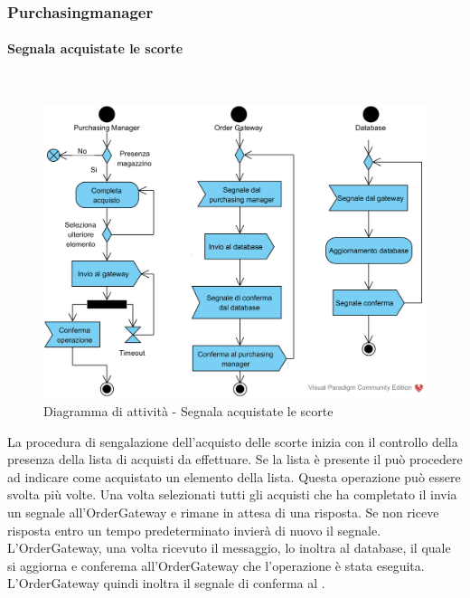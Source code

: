 \subsubsection{Purchasingmanager}


\paragraph{Segnala acquistate le scorte}\mbox{}\\
\nopagebreak
\begin{figure}[H]
	\centering
	\includegraphics[width=14cm]{diagrammi_img/attivita/responsabile_acquisto.png}
	\caption{Diagramma di attività - Segnala acquistate le scorte}
\end{figure}
La procedura di sengalazione dell'acquisto delle scorte inizia con il controllo della presenza della lista di acquisti da effettuare. Se la lista è presente il \Purchasingmanager{} può procedere ad indicare come acquistato un elemento della lista. Questa operazione può essere svolta più volte. Una volta selezionati tutti gli acquisti che ha completato il \Purchasingmanager{} invia un segnale all'OrderGateway e rimane in attesa di una risposta. Se non riceve risposta entro un tempo predeterminato invierà di nuovo il segnale. L'OrderGateway, una volta ricevuto il messaggio, lo inoltra al database, il quale si aggiorna e conferema all'OrderGateway che l'operazione è stata eseguita. L'OrderGateway quindi inoltra il segnale di conferma al \Purchasingmanager{}.

